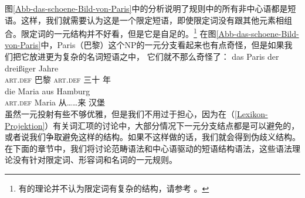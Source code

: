 图\ref{Abb-das-schoene-Bild-von-Paris}中的分析说明了规则中的所有非中心语都是短语。这样，我们就需要认为这是一个限定短语，即使限定词没有跟其他元素相组合。限定词的一元结构并不好看，但是它是自足的。\footnote{%
有的\xbarc 理论并不认为限定词有复杂的结构，请参考 。
}
在图\ref{Abb-das-schoene-Bild-von-Paris}中，Paris（巴黎）这个NP的一元分支看起来也有点奇怪，但是如果我们把它放进更为复杂的名词短语之中， 它们就不那么奇怪了：
\eal
\ex 
\gll das Paris der dreißiger Jahre\\
	 \textsc{art}.\textsc{def} 巴黎 \textsc{art}.\textsc{def} 三十 年\\
\ex 
\gll die Maria aus Hamburg\\
	 \textsc{art}.\textsc{def} Maria 从……来 汉堡\\
\zl
虽然一元投射有些不够优雅，但是我们不用过于担心，因为在（\ref{Lexikon-Projektion}）有关词汇项的讨论中，大部分情况下一元分支结点都是可以避免的，或者说我们争取避免这样的结构。如果不这样做的话，我们就会得到伪歧义结构。在下面的章节中，我们将讨论范畴语法和中心语驱动的短语结构语法，这些语法理论没有针对限定词、形容词和名词的一元规则。

